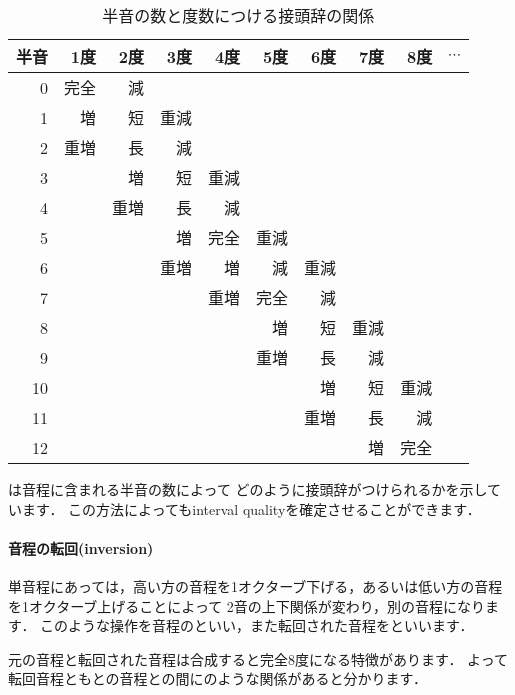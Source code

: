 \documentclass[dvipdfmx,uplatex,b5paper,openany,jbase=12Q,nomag*,textwidth-limit=44%
               ]{gachimuchi}[2020/05/05]
\begin{document}
\begin{table}[ht]
\centering
\caption{半音の数と度数につける接頭辞の関係}%
\begin{tabular}{r||r r r r r r r|r|r}
半音&  1度&  2度&  3度&  4度&  5度&  6度&  7度&  8度&$\cdots$\\\hline
0&    完全&  減&    &    &    &    &    &    &\\
1&    増&    短&    重減&  &    &    &    &    &\\
2&    重増&  長&    減&    &    &    &    &    &\\
3&      &  増&    短&    重減&  &    &    &    &\\
4&      &  重増&  長&    減&    &    &    &    &\\
5&      &    &  増&    完全&  重減&  &    &    &\\
6&      &    &  重増&  増&    減&    重減&  &    &\\
7&      &    &  &    重増&  完全&  減&    &    &\\
8&      &    &  &    &    増&    短&    重減&  &\\
9&      &    &  &    &    重増&  長&    減&    &\\
10&      &    &  &    &    &    増&    短&    重減&\\
11&      &    &  &    &    &    重増&  長&    減&\\
12&      &    &  &    &    &    &    増&    完全&
\end{tabular}
\end{table}

は音程に含まれる半音の数によって
どのように接頭辞がつけられるかを示しています．
この方法によってもinterval qualityを確定させることができます．

\paragraph{音程の転回(inversion)}
単音程にあっては，高い方の音程を1オクターブ下げる，あるいは低い方の音程を1オクターブ上げることによって
2音の上下関係が変わり，別の音程になります．
このような操作を音程のといい，また転回された音程をといいます．

元の音程と転回された音程は合成すると完全8度になる特徴があります．
よって転回音程ともとの音程との間にのような関係があると分かります．
\end{document}
